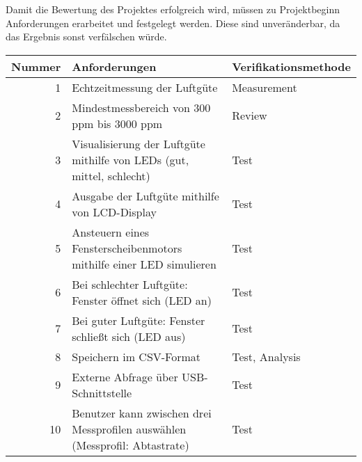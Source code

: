 \label{Anforderungen}

Damit die Bewertung des Projektes erfolgreich wird, müssen zu Projektbeginn Anforderungen erarbeitet und festgelegt werden. Diese sind unveränderbar, da das Ergebnis sonst verfälschen würde. \\

\begin{table}[!hbt]
	
	\centering
	
	\begin{tabular}{|r| p{8.4cm}|p{4.7cm}|}
		
		\hline
		Nummer & Anforderungen & Verifikationsmethode \\
		\hline
		1 & Echtzeitmessung der Luftgüte & Measurement \\
		\hline
		2 & Mindestmessbereich von 300 ppm bis 3000 ppm & Review \\
		\hline
		3 & Visualisierung der Luftgüte mithilfe von LEDs (gut, mittel, schlecht) & Test \\
		\hline
		4 & Ausgabe der Luftgüte mithilfe von LCD-Display & Test \\
		\hline
		5 & Ansteuern eines Fensterscheibenmotors mithilfe einer LED simulieren & Test \\
		\hline
		6 & Bei schlechter Luftgüte: Fenster öffnet sich (LED an) & Test \\
		\hline
		7 & Bei guter Luftgüte: Fenster schließt sich (LED aus) & Test \\
		\hline
		8 & Speichern im CSV-Format & Test, Analysis\\
		\hline
		9 & Externe Abfrage über USB-Schnittstelle & Test \\
		\hline
		10 & Benutzer kann zwischen drei Messprofilen auswählen (Messprofil: Abtastrate) & Test \\
		\hline
		
	\end{tabular}

\label{tab:Anforderungen}

\end{table}